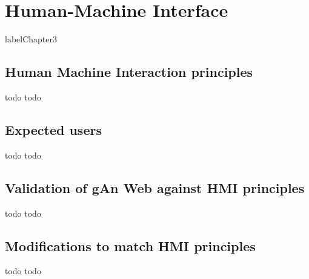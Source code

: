 

\chapter{Human-Machine Interface } %

label{Chapter3} %




\section{Human Machine Interaction principles}
todo todo

\section{Expected users}
todo todo

\section{Validation of gAn Web against HMI principles}
todo todo

\section{Modifications to match HMI principles}
todo todo
